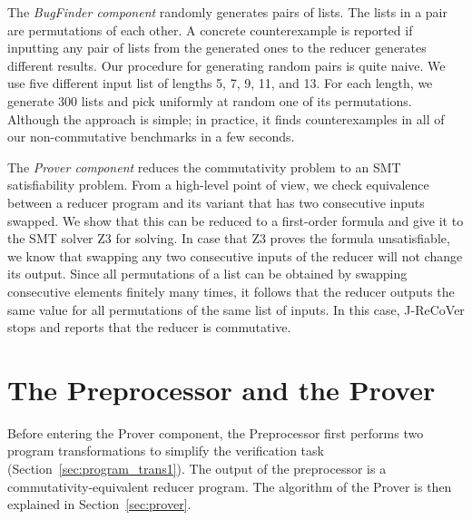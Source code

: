 \documentclass{llncs}
\begin{document}
\enlargethispage{4mm}

The \emph{BugFinder component} randomly generates pairs of lists. The lists in a
pair are permutations of each other. A concrete counterexample is reported if
inputting any pair of lists from the generated ones to the reducer generates
different results. Our procedure for generating random pairs is quite naive. We
use five different input list of lengths 5, 7, 9, 11, and 13. For each length,
we generate 300 lists and pick uniformly at random one of its permutations.
Although the approach is simple; in practice, it finds counterexamples in all of
our non-commutative benchmarks in a few seconds. 

The \emph{Prover component} reduces the commutativity problem to an SMT
satisfiability problem. From a high-level point of view, we check equivalence
between a reducer program and its variant that has two consecutive inputs
swapped. We show that this can be reduced to a first-order formula and give it
to the SMT solver Z3 for solving. In case that Z3 proves the formula
unsatisfiable, we know that swapping any two consecutive inputs of the reducer
will not change its output. Since all permutations of a list can be obtained by
swapping consecutive elements finitely many times, it follows that the reducer
outputs the same value for all permutations of the same list of inputs. In this
case, J-ReCoVer stops and reports that the reducer is commutative.

\vspace*{-2mm}
\section{The Preprocessor and the Prover} \label{sec:preprocessor_prover}
\vspace*{-1mm}

Before entering the Prover component, the Preprocessor first performs two
program transformations to simplify the verification task
(Section~\ref{sec:program_trans1}). The output of the preprocessor is a
commutativity-equivalent reducer program. The algorithm of the Prover is then
explained in Section~\ref{sec:prover}. 

\vspace*{-2mm}
\end{document}
